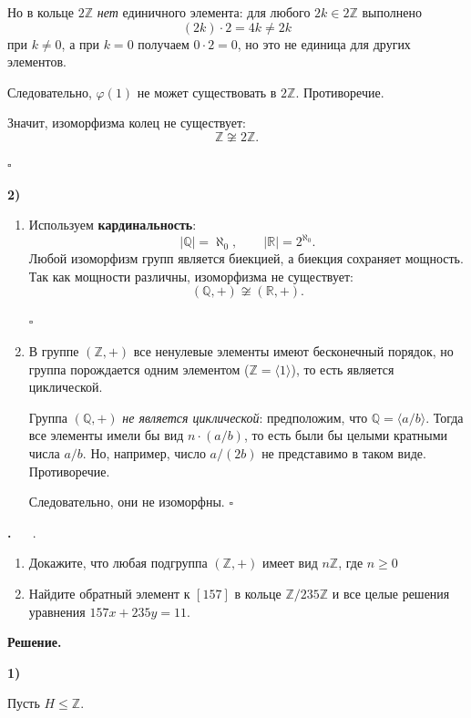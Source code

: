 \documentclass[12pt,a4paper]{article}
\newcounter{task}                   %
\newenvironment{task}[1][]{%
  \refstepcounter{task}%
  \par\vspace{0.3\baselineskip}%
  \noindent\textbf{\thetask.}%
  \if\relax\detokenize{#1}\relax   %
    \ \ignorespaces                 %
  \else
    \ \textbf{#1}.\ \ignorespaces   %
  \fi
}{%
  \par\vspace{0.2\baselineskip}%
}
\newcommand{\sol}{%
  \par\vspace{0.3\baselineskip}%
  \noindent\textbf{Решение.}\ %
  \ignorespaces                     %
}
\newcommand{\soli}[1]{%
  \par\vspace{0.15\baselineskip}%
  \noindent\textbf{#1)}\ %
  \ignorespaces                     %
}
\begin{document}
Но в кольце $2\mathbb{Z}$ \emph{нет} единичного элемента: для любого $2k \in 2\mathbb{Z}$ выполнено
\[
(2k) \cdot 2 = 4k \neq 2k
\]
при $k \neq 0$, а при $k=0$ получаем $0\cdot 2 = 0$, но это не единица для других элементов.

Следовательно, $\varphi(1)$ не может существовать в $2\mathbb{Z}$. Противоречие.

Значит, изоморфизма колец не существует:
\[
\mathbb{Z} \not\cong 2\mathbb{Z}.
\]

\hfill $\square$

\newpage

\soli{2} 
\begin{enumerate}
    \item Используем \textbf{кардинальность}:
    \[
    |\mathbb{Q}| = \aleph_0, \qquad |\mathbb{R}| = 2^{\aleph_0}.
    \]
    Любой изоморфизм групп является биекцией, а биекция сохраняет мощность. Так как мощности различны, изоморфизма не существует:
    \[
    (\mathbb{Q}, +) \not\cong (\mathbb{R}, +).
    \]

    \hfill $\square$

    \item В группе $(\mathbb{Z}, +)$ все ненулевые элементы имеют бесконечный порядок, но группа порождается одним элементом ($\mathbb{Z} = \langle 1 \rangle$), то есть является циклической.

    Группа $(\mathbb{Q}, +)$ \emph{не является циклической}: предположим, что $\mathbb{Q} = \langle a/b \rangle$. Тогда все элементы имели бы вид $n \cdot (a/b)$, то есть были бы целыми кратными числа $a/b$. Но, например, число $a/(2b)$ не представимо в таком виде. Противоречие.

    Следовательно, они не изоморфны. \hfill $\square$
\end{enumerate}



\begin{task}
    \begin{enumerate}
	\item Докажите, что любая подгруппа $(\mathbb{Z}, +)$ имеет вид $n \mathbb{Z}$, где $n \geq 0$
	\item Найдите обратный элемент к $[157]$ в кольце $\mathbb{Z}/235\mathbb{Z}$ и все целые решения уравнения $157x + 235y = 11$. 
    \end{enumerate}
\end{task}


\sol
\soli{1}
Пусть $H \leqslant \mathbb{Z}$.
\end{document}
